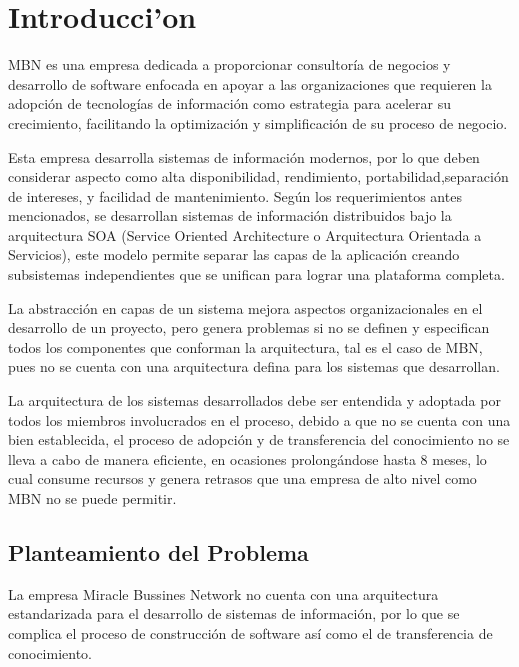 
\chapter{Introducci'on}

MBN es una empresa dedicada a proporcionar consultoría de negocios y desarrollo de software enfocada en apoyar a las organizaciones que requieren la adopción de tecnologías de información como estrategia para acelerar su crecimiento, facilitando la optimización y simplificación de su proceso de negocio.

Esta empresa desarrolla sistemas de información modernos, por lo que deben considerar aspecto como alta disponibilidad, rendimiento, portabilidad,separación de intereses, y facilidad de mantenimiento. Según los requerimientos antes mencionados, se desarrollan sistemas de información distribuidos bajo la arquitectura SOA (Service Oriented Architecture o Arquitectura Orientada a Servicios), este modelo permite separar las capas de la aplicación creando subsistemas independientes que se unifican para lograr una plataforma completa. 

La abstracción en capas de un sistema mejora aspectos organizacionales en el desarrollo de un proyecto, pero genera problemas si no se definen y especifican todos los componentes que conforman la arquitectura, tal es el caso de MBN, pues no se cuenta con una arquitectura defina para los sistemas que desarrollan. 

La arquitectura de los sistemas desarrollados debe ser entendida y adoptada por todos los miembros involucrados en el proceso, debido a que no se cuenta con una bien establecida, el proceso de adopción y de transferencia del conocimiento no se lleva a cabo de manera eficiente,  en ocasiones prolongándose hasta 8 meses, lo cual consume recursos y genera retrasos que una empresa de alto nivel como MBN no se puede permitir.

\section{ Planteamiento del Problema }
La empresa Miracle Bussines Network no cuenta con una arquitectura estandarizada para el desarrollo de sistemas de información, por lo que se complica el proceso de construcción de software así como el de transferencia de conocimiento.


